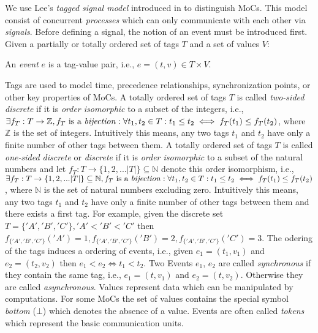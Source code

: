 We use Lee's \emph{tagged signal model} introduced in \cite{Lee98} to
distinguish MoCs. This model consist of concurrent \emph{processes} which
can only communicate with each other via \emph{signals}.
Before defining a signal, the notion of an event must be introduced first.
Given a partially or totally ordered set of tags $T$ and a set of values $V$:
\begin{sdefinition}
An \emph{event} $e$ is a  tag-value pair, i.e., $e = (t,v) \in T \times V$.
\end{sdefinition}
Tags are used to model time,
precedence relationships, synchronization points, or other key properties
of MoCs.
A totally ordered set of tags $T$ is called \emph{two-sided discrete} if it is
\emph{order isomorphic} to a subset of the integers,
i.e.,$\exists{f_T : T \to \mathbb{Z}, f_T\textrm{ is a \emph{bijection}}}:
 \forall{t_1,t_2 \in T}: t_1 \le t_2 \iff f_T(t_1) \le f_T(t_2)$,
where $\mathbb{Z}$ is the set of integers. Intuitively this means, any two
tags $t_1$ and $t_2$ have only a finite number of other tags between them.
A totally ordered set of tags $T$ is called \emph{one-sided discrete} or \emph{discrete}
if it is \emph{order isomorphic} to a subset of the natural numbers and
let $f_T: T \to \{1,2,...|T|\} \subseteq \mathbb{N}$ denote this order isomorphism, i.e.,
$\exists{f_T : T \to \{1,2,...|T|\} \subseteq \mathbb{N}, f_T\textrm{ is a \emph{bijection}}}:
 \forall{t_1,t_2 \in T}: t_1 \le t_2 \iff f_T(t_1) \le f_T(t_2)$,
where $\mathbb{N}$ is the set of natural numbers excluding zero.
Intuitively this means, any two tags $t_1$ and $t_2$ have only a
finite number of other tags between them and there exists a first tag.
For example, given the discrete set $T = \{'A','B','C'\}, 'A' < 'B' < 'C'$
then $f_{\{'A','B','C'\}}('A') = 1, f_{\{'A','B','C'\}}('B') = 2, f_{\{'A','B','C'\}}('C') = 3$.
The odering of the tags induces
a ordering of events, i.e., given $e_1 = (t_1,v_1)$ and $e_2 = (t_2,v_2)$ then $e_1 < e_2 \iff t_1 < t_2$.
Two Events $e_1$, $e_2$ are called \emph{synchronous} if they contain
the same tag, i.e., $e_1 = (t,v_1)$ and $e_2 = (t,v_2)$. Otherwise they
are called \emph{asynchronous}.
Values represent data which can be manipulated by computations.
For some MoCs the set of values contains the special symbol \emph{bottom} ($\bot$)
which denotes the absence of a value.
Events are often called \emph{tokens} which represent the basic communication units.

